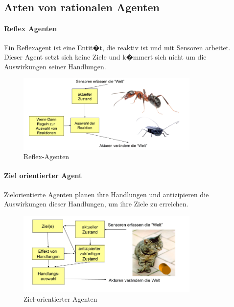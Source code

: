 \subsection{Arten von rationalen Agenten}

\paragraph{Reflex Agenten}

Ein Reflexagent ist eine Entit�t, die reaktiv ist und mit Sensoren arbeitet. Dieser Agent setzt sich keine Ziele und k�mmert sich nicht um die Auswirkungen seiner Handlungen.

\begin{figure}[H]
    \centering
    \includegraphics[width=0.8\textwidth]{figures/reflex-agent.png}
    \caption{Reflex-Agenten}
    \label{fig:reflex-agent}
\end{figure}

\paragraph{Ziel orientierter Agent}

Zielorientierte Agenten planen ihre Handlungen und antizipieren die Auswirkungen dieser Handlungen, um ihre Ziele zu erreichen.

\begin{figure}[H]
    \centering
    \includegraphics[width=0.8\textwidth]{figures/goal-oriented-agents.png}
    \caption{Ziel-orientierter Agenten}
    \label{fig:ziel-orientierter-agent}
\end{figure}

